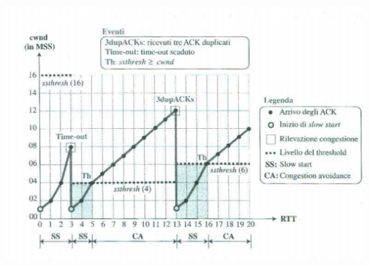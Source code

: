 \documentclass[12pt]{report}
\begin{document}
	\begin{center}
		\includegraphics[scale=0.6]{assets/taho.png}
	\end{center}
\end{document}
